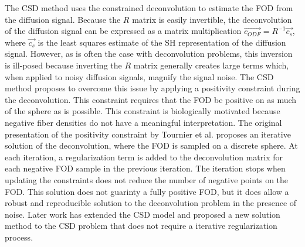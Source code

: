 The CSD method uses the constrained deconvolution to estimate the FOD from the diffusion signal. Because the $R$ matrix is easily invertible, the deconvolution of the diffusion signal can be expressed as a matrix multiplication $\vec{c_{ODF}} = R^{-1}\vec{c_s}$, where $\vec{c_s}$ is the least squares estimate of the SH representation of the diffusion signal. However, as is often the case with deconvolution problems, this inversion is ill-posed because inverting the $R$ matrix generally creates large terms which, when applied to noisy diffusion signals, magnify the signal noise. The CSD method proposes to overcome this issue by applying a positivity constraint during the deconvolution. This constraint requires that the FOD be positive on as much of the sphere as is possible. This constraint is biologically motivated because negative fiber densities do not have a meaningful interpretation. The original presentation of the positivity constraint by Tournier et al. proposes an iterative solution of the deconvolution, where the FOD is sampled on a discrete sphere. At each iteration, a regularization term is added to the deconvolution matrix for each negative FOD sample in the previous iteration. The iteration stops when updating the constraints does not reduce the number of negative points on the FOD. This solution does not guarinty a fully positive FOD, but it does allow a robust and reproducible solution to the deconvolution problem in the presence of noise. Later work has extended the CSD model and proposed a new solution method to the CSD problem that does not require a iterative regularization process.

%